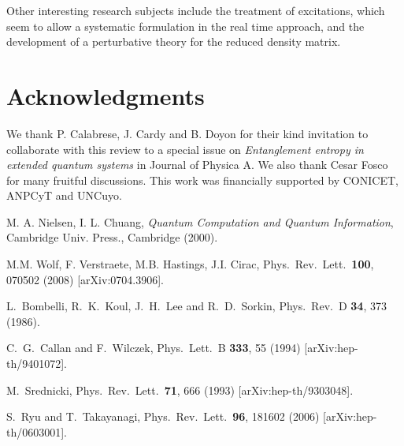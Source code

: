 \documentclass[11pt]{article}
\begin{document}
Other interesting research subjects include the treatment of excitations, which seem to allow a systematic formulation in the real time approach, and the development of a perturbative theory for the reduced density matrix.

 \section*{Acknowledgments}
We thank P. Calabrese, J. Cardy and B. Doyon for their kind invitation to collaborate with this review to a special issue on {\sl Entanglement entropy in extended quantum systems} in Journal of Physica A. 
 We also thank Cesar Fosco for many fruitful discussions. This work was financially supported by CONICET, ANPCyT and UNCuyo. 
 
\raggedright
\begin{thebibliography}{99}


M. A. Nielsen, I. L. Chuang, {\sl Quantum Computation and Quantum Information}, Cambridge Univ. Press., Cambridge  (2000). 

   
 M.M. Wolf, F. Verstraete, M.B. Hastings, J.I. Cirac, 
   Phys.\ Rev.\ Lett.\ {\bf 100}, 070502 (2008) 
[arXiv:0704.3906].


L.~Bombelli, R.~K.~Koul, J.~H.~Lee and R.~D.~Sorkin,
 Phys.\ Rev.\ D {\bf 34}, 373 (1986).

  C.~G.~Callan and F.~Wilczek,
 Phys.\ Lett.\ B {\bf 333}, 55 (1994)
[arXiv:hep-th/9401072].


 M.~Srednicki,
 Phys.\ Rev.\ Lett.\  {\bf 71}, 666 (1993)
 [arXiv:hep-th/9303048]. 
 
  S.~Ryu and T.~Takayanagi,
  Phys.\ Rev.\ Lett.\  {\bf 96}, 181602 (2006)
  [arXiv:hep-th/0603001].


\end{thebibliography}
\end{document}
